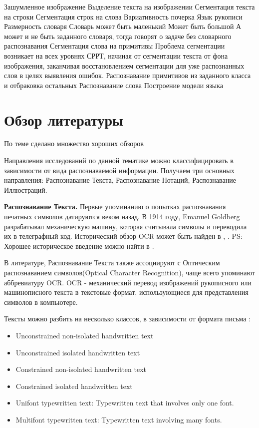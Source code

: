 Зашумленное изображение
Выделение текста на изображении
Сегментация текста на строки
Сегментация строк на слова
Вариативность почерка
Язык рукописи
Размерность словаря
Словарь может быть маленький
Может быть большой
А может и не быть заданного словаря, тогда говорят о задаче без словарного распознавания 
Сегментация слова на примитивы
Проблема сегментации возникает на всех уровнях СРРТ, начиная от сегментации текста от фона изображения, заканчивая восстановлением сегментации для уже распознанных слов в целях выявления ошибок.
Распознавание примитивов из заданного класса и отбраковка остальных
Распознавание слова
Построение модели языка

\section*{Обзор литературы}

По теме сделано множество хороших обзоров \cite{bunke2003recognition, plotz2009markov, rehman2012off, fujisawa2008forty, plamondon2000online, steinherz1999offline, vinciarelli2002survey}

Направления исследований по данной тематике можно классифицировать в зависимости от вида распознаваемой информации. Получаем три основных направления: Распознавание Текста, Распознавание Нотаций, Распознавание Иллюстраций.

\textbf{Распознавание Текста.} Первые упоминанию о попытках распознавания печатных символов датируются веком назад. В 1914 году, Emanuel Goldberg разрабатывал механическую машину, которая считывала символы и переводила их в телеграфный код. Исторический обзор OCR может быть найден в \cite{mori1992historical}, \cite{herbert1982history}. PS: Хорошее историческое введение можно найти в \cite{durebrandt2015segmentation}.

В литературе, Распознавание Текста также ассоциируют с Оптическим распознаванием символов(Optical Character Recognition), чаще всего упоминают аббревиатуру OCR. OCR - механический перевод изображений рукописного или машинописного текста в текстовые формат, использующиеся для представления символов в компьютере.

\noindent Тексты можно разбить на несколько классов, в зависимости от формата письма \cite{salunke2015state}:
\begin{itemize}
  \item Unconstrained non-isolated handwritten text
  \item Unconstrained isolated handwritten text
  \item Constrained non-isolated handwritten text
  \item Constrained isolated handwritten text
  \item Unifont typewritten text: Typewritten text that involves only one font.
  \item Multifont typewritten text: Typewritten text involving many fonts.
\end{itemize}

